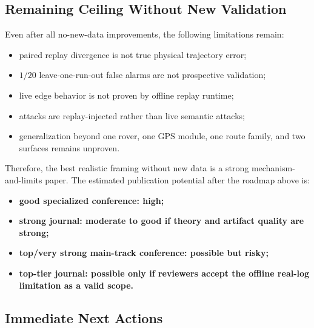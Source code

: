 \subsection{Remaining Ceiling Without New Validation}

Even after all no-new-data improvements, the following limitations remain:

\begin{itemize}
    \item paired replay divergence is not true physical trajectory error;
    \item $1/20$ leave-one-run-out false alarms are not prospective validation;
    \item live edge behavior is not proven by offline replay runtime;
    \item attacks are replay-injected rather than live semantic attacks;
    \item generalization beyond one rover, one GPS module, one route family,
    and two surfaces remains unproven.
\end{itemize}

Therefore, the best realistic framing without new data is a strong
mechanism-and-limits paper. The estimated publication potential after the
roadmap above is:

\begin{itemize}
    \item \textbf{good specialized conference: high;}
    \item \textbf{strong journal: moderate to good if theory and artifact
    quality are strong;}
    \item \textbf{top/very strong main-track conference: possible but risky;}
    \item \textbf{top-tier journal: possible only if reviewers accept the
    offline real-log limitation as a valid scope.}
\end{itemize}

\subsection{Immediate Next Actions}

